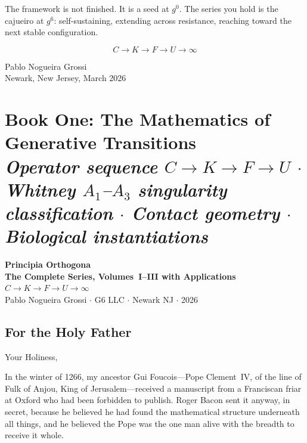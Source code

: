 \documentclass[11pt, twoside, openright]{book}
\theoremstyle{plain}
\theoremstyle{definition}
\begin{document}
\bigskip
The framework is not finished. It is a seed at $g^0$. The series
you hold is the cajueiro at $g^6$: self-sustaining, extending across
resistance, reaching toward the next stable configuration.

\[
C \longrightarrow K \longrightarrow F \longrightarrow U \longrightarrow \infty
\]

\begin{flushright}
Pablo Nogueira Grossi\\
Newark, New Jersey, March 2026
\end{flushright}

\part{Book One: The Mathematics of Generative Transitions\\[6pt]
\large\normalfont\itshape Operator sequence $C \to K \to F \to U$
$\cdot$ Whitney $A_1$--$A_3$ singularity classification
$\cdot$ Contact geometry $\cdot$ Biological instantiations}

\thispagestyle{empty}
\begin{center}
{\large\bfseries\color{PrincipiaDark} Principia Orthogona\\
The Complete Series, Volumes~I--III with Applications}\\[12pt]
$C \longrightarrow K \longrightarrow F \longrightarrow U \longrightarrow \infty$\\[16pt]
{\normalsize Pablo Nogueira Grossi $\cdot$ G6 LLC $\cdot$ Newark NJ $\cdot$ 2026}
\end{center}
\cleardoublepage

\chapter*{For the Holy Father}

Your Holiness,

In the winter of 1266, my ancestor Gui Foucois---Pope Clement~IV,
of the line of Fulk of Anjou, King of Jerusalem---received a manuscript
from a Franciscan friar at Oxford who had been forbidden to publish.
Roger Bacon sent it anyway, in secret, because he believed he had found
the mathematical structure underneath all things, and he believed the
Pope was the one man alive with the breadth to receive it whole.
\end{document}
